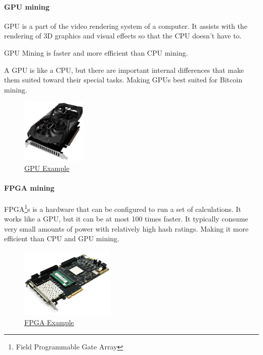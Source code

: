 \documentclass{article}
\newcommand\tab[1][1cm]{\hspace*{#1}}
\begin{document}
\paragraph{GPU mining}

\tab GPU is a part of the video rendering system of a computer. It assists with the rendering of 3D graphics and visual effects so that the CPU doesn't have to.

GPU Mining is faster and more efficient than CPU mining.

A GPU is like a CPU, but there are important internal differences that make them suited toward their special tasks. Making GPUs best suited for Bitcoin mining.

\begin{figure}[H]
    \begin{center}
        \includegraphics[width=0.275\textwidth]{images/gpu.png}
        \caption{\href{https://wccftech.com/nvidia-cmp-30hx-cryptocurrency-mining-gpu-gigabyte-listed-for-over-700-usd-3-month-warranty/}{\underline{GPU Example}}}
    \end{center}
\end{figure}

\paragraph{FPGA mining}

FPGA\footnote{Field Programmable Gate Array}s is a hardware that can be configured to run a set of calculations. It works like a GPU, but it can be at most 100 times faster. It typically consume very small amounts of power with relatively high hash ratings. Making it more efficient than CPU and GPU mining.

\begin{figure}[H]
    \begin{center}
        \includegraphics[width=0.4\textwidth]{images/fpga.jpeg}
        \caption{\href{https://wccftech.com/nvidia-cmp-30hx-cryptocurrency-mining-gpu-gigabyte-listed-for-over-700-usd-3-month-warranty/}{\underline{FPGA Example}}}
    \end{center}
\end{figure}
\end{document}
